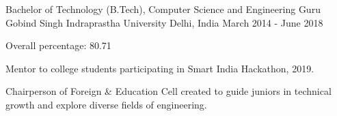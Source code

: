 
\begin{cventries}

  \cventry
    {Bachelor of Technology (B.Tech), Computer Science and Engineering} %
    {Guru Gobind Singh Indraprastha University} %
    {Delhi, India} %
    {March 2014 - June 2018} %
    {
      \begin{cvitems} %
        \item {Overall percentage: 80.71}
        \item {Mentor to college students participating in Smart India Hackathon, 2019.}
        \item {Chairperson of Foreign \& Education Cell created to guide juniors in technical growth and explore diverse fields of engineering.}
      \end{cvitems}
    }

\end{cventries}
